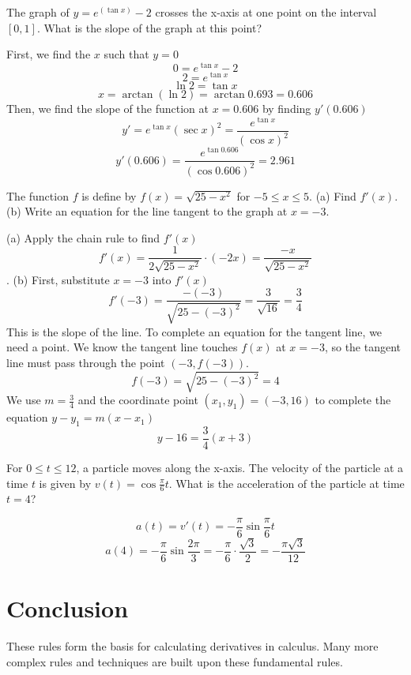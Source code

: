 \begin{Exercise}
    [label=deriv_rules8]
    The graph of $y=e^(\tan{x})-2$ crosses the x-axis at one point on the interval $[0, 1]$. What is the slope of the graph at this point?
\end{Exercise}

\begin{Answer}
    [ref=deriv_rules8]
    First, we find the $x$ such that $y=0$ $$0 = e^{\tan{x}} - 2$$ $$2 = e^{\tan{x}}$$ $$\ln{2} = \tan{x}$$ $$x=\arctan{(\ln{2})} = \arctan{0.693} = 0.606$$
    Then, we find the slope of the function at $x=0.606$ by finding $y'(0.606)$ $$y'=e^{\tan{x}}(\sec{x})^2  = \frac{e^{\tan{x}}}{(\cos{x})^2}$$
    $$y'(0.606) = \frac{e^{\tan{0.606}}}{(\cos{0.606})^2} = 2.961$$
\end{Answer}

\begin{Exercise}
    [label=deriv_rules9]
    The function $f$ is define by $f(x) = \sqrt{25-x^2}$ for $-5 \leq x \leq 5$. (a) Find $f'(x)$. (b) Write an equation for the line tangent to the graph at $x=-3$. 
\end{Exercise}
\begin{Answer}
    [ref=deriv_rules9]
    (a) Apply the chain rule to find $f'(x)$ $$f'(x) = \frac{1}{2\sqrt{25-x^2}} \cdot(-2x)=\frac{-x}{\sqrt{25-x^2}}$$. 
    (b) First, substitute $x=-3$ into $f'(x)$ $$f'(-3) = \frac{-(-3)}{\sqrt{25-(-3)^2}}=\frac{3}{\sqrt{16}}=\frac{3}{4}$$
    This is the slope of the line. To complete an equation for the tangent line, we need a point. We know the tangent line touches $f(x)$ at $x=-3$, so the tangent line must pass through the point $(-3, f(-3))$. $$f(-3) = \sqrt{25-(-3)^2}=4$$ We use $m = \frac{3}{4}$ and the coordinate point $(x_1, y_1) = (-3, 16)$ to complete the equation $y-y_1 = m(x-x_1)$ $$y-16 = \frac{3}{4}(x+3)$$
\end{Answer}

\begin{Exercise}
    [label=deriv_rules10]
    For $0 \leq t \leq 12$, a particle moves along the x-axis. The velocity of the particle at a time $t$ is given by $v(t) = \cos{\frac{\pi}{6}t}$. What is the acceleration of the particle at time $t=4$?
\end{Exercise}
\begin{Answer}
    [ref=deriv_rules10]
    $$a(t) = v'(t) = -\frac{\pi}{6}\sin{\frac{\pi}{6}t}$$
    $$a(4) = -\frac{\pi}{6}\sin{\frac{2\pi}{3}} = -\frac{\pi}{6}\cdot\frac{\sqrt{3}}{2}=-\frac{\pi \sqrt{3}}{12}$$
\end{Answer}

\section{Conclusion}

These rules form the basis for calculating derivatives in
calculus. Many more complex rules and techniques are built upon these
fundamental rules.
